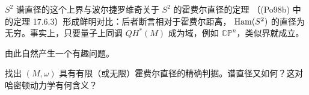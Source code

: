 $S^2$ 谱直径的这个上界与波尔捷罗维奇关于 $S^2$ 的霍费尔直径的定理
（(Po98b) 中的定理 17.6.3）形成鲜明对比：后者断言相对于霍费尔距离，
$\operatorname{Ham}(S^2)$ 的直径为无穷。事实上，只要量子上同调 $QH^*(M)$ 成为域，例如
$\mathbb{CP}^n$，类似界就成立。

由此自然产生一个有趣问题。

\begin{question}
\label{ques:22-hofer-spectral-diameter}
找出 $(M,\omega)$ 具有有限（或无限）霍费尔直径的精确判据。谱直径又如何？这对
哈密顿动力学有何含义？
\end{question}
